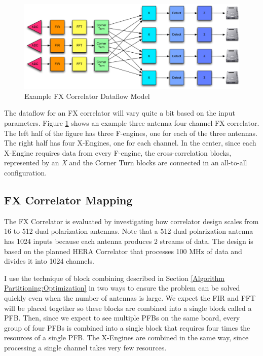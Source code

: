 \begin{figure}[h!]
  \centering
    \includegraphics[width=1\textwidth]{Images/C4/fx_dataflow.pdf}
  \caption{Example FX Correlator Dataflow Model}
  \label{fig: C6/fx_dataflow.pdf}
\end{figure}

The dataflow for an FX correlator will vary quite a bit based on the input parameters. 
Figure \ref{fig: C6/fx_dataflow.pdf} shows an example three antenna four channel FX correlator. 
The left half of the figure has three F-engines, one for each of the three antennas.
The right half has four X-Engines, one for each channel.
In the center, since each X-Engine requires data from every F-engine, the cross-correlation blocks, represented by an \emph{X} and the Corner Turn blocks are connected in an all-to-all configuration.

\subsection{FX Correlator Mapping}
The FX Correlator is evaluated by investigating how correlator design scales from 16 to 512 dual polarization antennas.
Note that a 512 dual polarization antenna has 1024 inputs because each antenna produces 2 streams of data.
The design is based on the planned HERA Correlator that processes 100 MHz of data and divides it into 1024 channels.

I use the technique of block combining described in Section \ref{Algorithm Partitioning:Optimization} in two ways to ensure the problem can be solved quickly even when the number of antennas is large.
We expect the FIR and FFT will be placed together so these blocks are combined into a single block called a PFB.
Then, since we expect to see multiple PFBs on the same board, every group of four PFBs is combined into a single block that requires four times the resources of a single PFB.
The X-Engines are combined in the same way, since processing a single channel takes very few resources.

